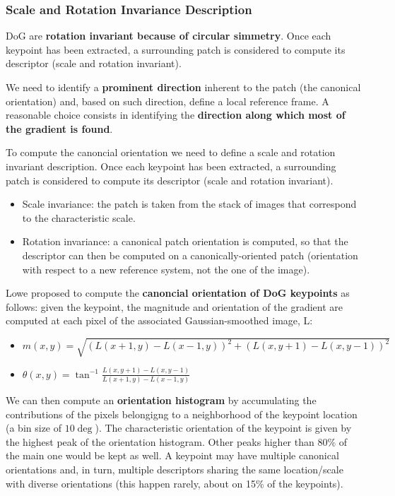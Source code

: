\subsubsection{Scale and Rotation Invariance Description}

DoG are \textbf{rotation invariant because of circular simmetry}.
Once each keypoint has been extracted, a surrounding patch is considered to compute its descriptor (scale and rotation invariant).

We need to identify a \textbf{prominent direction} inherent to the patch (the canonical orientation) and, based on such direction, define a local reference frame.
A reasonable choice consists in identifying the \textbf{direction along which most of the gradient is found}.

To compute the canoncial orientation we need to define a scale and rotation invariant description.
Once each keypoint has been extracted, a surrounding patch is considered to compute its descriptor (scale and rotation invariant).
\begin{itemize}
  \item Scale invariance: the patch is taken from the stack of images that correspond to the characteristic scale.
  \item Rotation invariance: a canonical patch orientation is computed, so that the descriptor can then be computed on a canonically-oriented patch (orientation with respect to a new reference system, not the one of the image).
\end{itemize}

Lowe proposed to compute the \textbf{canoncial orientation of DoG keypoints} as follows: given the keypoint, the magnitude and orientation of the gradient are computed at each pixel of the associated Gaussian-smoothed image, L:

\begin{itemize}
  \item $m(x,y) = \sqrt{(L(x+1,y)-L(x-1,y))^2 + (L(x,y+1) - L(x,y-1))^2}$
  \item $\theta(x,y) = \tan^{-1}\frac{L(x,y+1)-L(x,y-1)}{L(x+1,y)-L(x-1,y)}$
\end{itemize}

We can then compute an \textbf{orientation histogram} by accumulating the contributions of the pixels belongigng to a neighborhood of the keypoint location (a bin size of $10\deg$).
The characteristic orientation of the keypoint is given by the highest peak of the orientation histogram.
Other peaks higher than $80\%$ of the main one would be kept as well.
A keypoint may have multiple canonical orientations and, in turn, multiple descriptors sharing the same location/scale with diverse orientations (this happen rarely, about on 15\% of the keypoints).

